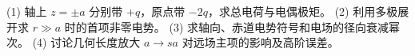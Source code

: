 (1) 轴上 \(z=\pm a\) 分别带 \(+q\)，原点带 \(-2q\)，求总电荷与电偶极矩。
(2) 利用多极展开求 \(r\gg a\) 时的首项非零电势。
(3) 求轴向、赤道电势符号和电场的径向衰减幂次。
(4) 讨论几何长度放大 \(a\to sa\) 对远场主项的影响及高阶误差。
